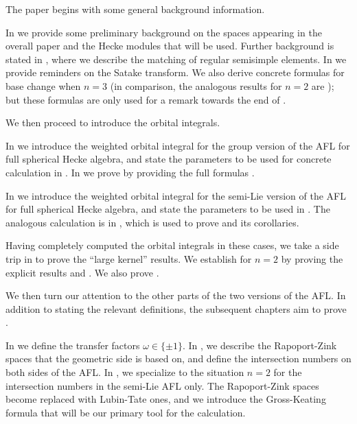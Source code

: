 \begin{itemize}
  \ii The paper begins with some general background information.
  \begin{itemize}
    \ii In  we provide some preliminary background
    on the spaces appearing in the overall paper and the Hecke modules that will be used.
    \ii Further background is stated in ,
    where we describe the matching of regular semisimple elements.
    \ii In  we provide reminders on the Satake transform.
    We also derive concrete formulas for base change when $n = 3$
    (in comparison, the analogous results for $n=2$ are
    \cite[Lemma 7.1.1]{ref:AFLspherical});
    but these formulas are only used for a remark towards the end of .
  \end{itemize}

  \ii We then proceed to introduce the orbital integrals.
  \begin{itemize}
    \ii In  we introduce the weighted orbital integral
    for the group version of the AFL for full spherical Hecke algebra,
    and state the parameters to be used for concrete calculation in .
    In  we prove 
    by providing the full formulas
    .

    \ii In  we introduce the weighted orbital integral
    for the semi-Lie version of the AFL for full spherical Hecke algebra,
    and state the parameters to be used in .
    The analogous calculation is in ,
    which is used to prove  and its corollaries.
  \end{itemize}

  \ii Having completely computed the orbital integrals in these cases,
  we take a side trip in  to prove the ``large kernel'' results.
  We establish  for $n = 2$
  by proving the explicit results
   and .
  We also prove .

  \ii We then turn our attention to the other parts of the two versions of the AFL.
  In addition to stating the relevant definitions,
  the subsequent chapters aim to prove .
  \begin{itemize}
    \ii In  we define the transfer factors $\omega \in \{\pm1\}$.
    \ii In , we describe the Rapoport-Zink spaces
    that the geometric side is based on, and define the intersection numbers
    on both sides of the AFL.
    \ii In , we specialize to the situation $n = 2$
    for the intersection numbers in the semi-Lie AFL only.
    The Rapoport-Zink spaces become replaced with Lubin-Tate ones,
    and we introduce the Gross-Keating formula
    that will be our primary tool for the calculation.
  \end{itemize}


\end{itemize}

